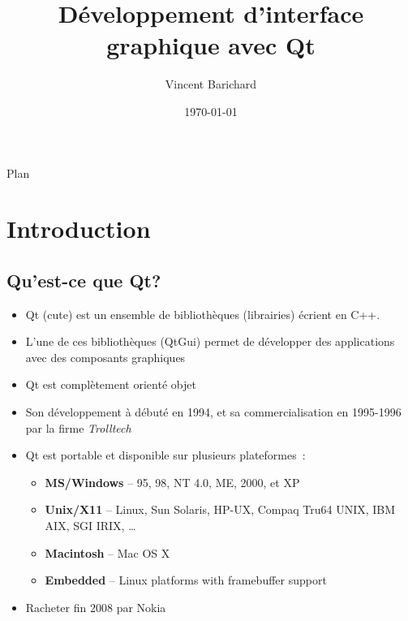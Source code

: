 \documentclass{beamer} %
\title{Développement d'interface graphique avec Qt}
\author{
Vincent Barichard \\ %
}
\institute{LERIA - Université d'Angers}
\date{ %
\today}
\begin{document}

\AtBeginSubsection[]
{
	\begin{frame}
	\begin{columns}[t]
		\begin{column}{6cm}
			\tableofcontents[sections={1-3},currentsection, currentsubsection]
		\end{column}
		\begin{column}{6cm}
    		\tableofcontents[sections={4-7},currentsection,currentsubsection]
		\end{column}
	\end{columns}
\end{frame}
}

\small

\begin{frame}
	\titlepage
\end{frame}

\begin{frame}{Plan}
\end{frame}

\section{Introduction}
\subsection{Qu'est-ce que Qt?}
\begin{frame}
	\begin{itemize}
	\item Qt (cute) est un ensemble de bibliothèques (librairies) écrient en C++.
	\item<2-> L'une de ces bibliothèques (QtGui) permet de développer des applications avec des composants graphiques
	\item<3-> Qt est complètement orienté objet
	\item<4-> Son développement à débuté en 1994, et sa commercialisation en 1995-1996 par la firme \textit{Trolltech}
	\item<5-> Qt est portable et disponible sur plusieurs plateformes~:
		\begin{itemize}
		\item \textbf{MS/Windows} -- 95, 98, NT 4.0, ME, 2000, et XP
		\item \textbf{Unix/X11} -- Linux, Sun Solaris, HP-UX, Compaq Tru64 UNIX, IBM AIX, SGI IRIX, \ldots
		\item \textbf{Macintosh} -- Mac OS X
		\item \textbf{Embedded} -- Linux platforms with framebuffer support
		\end{itemize}
	\item<6-> Racheter fin 2008 par Nokia
	\end{itemize}
\end{frame}
\end{document}
